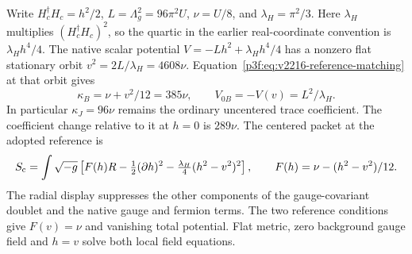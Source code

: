 \documentclass[11pt,a4paper]{article}
\begin{document}
Write \(H_c^\dagger H_c=h^2/2\), \(L=\Lambda_g^2=96\pi^2U\),
\(\nu=U/8\), and \(\lambda_H=\pi^2/3\).
Here \(\lambda_H\) multiplies \((H_c^\dagger H_c)^2\), so the quartic
in the earlier real-coordinate convention is \(\lambda_H h^4/4\).
The native scalar potential \(V=-Lh^2+\lambda_H h^4/4\) has a nonzero
flat stationary orbit \(v^2=2L/\lambda_H=4608\nu\).
Equation~\eqref{p3f:eq:v2216-reference-matching} at that orbit gives
\[
 \kappa_B=\nu+v^2/12=385\nu,\qquad V_{0B}=-V(v)=L^2/\lambda_H .
\]
In particular \(\kappa_J=96\nu\) remains the ordinary uncentered trace
coefficient. The coefficient change relative to it at \(h=0\) is
\(289\nu\). The centered packet at the adopted reference is
\[
 S_{\rm c}=\int\sqrt{-g}\left[
 F(h)R-\tfrac12(\partial h)^2
 -\tfrac{\lambda_H}{4}(h^2-v^2)^2\right],\qquad
 F(h)=\nu-(h^2-v^2)/12 .
\]
The radial display suppresses the other components of the gauge-covariant
doublet and the native gauge and fermion terms. The two reference
conditions give \(F(v)=\nu\) and vanishing total potential. Flat metric,
zero background gauge field and \(h=v\) solve both local field equations.
\end{document}
